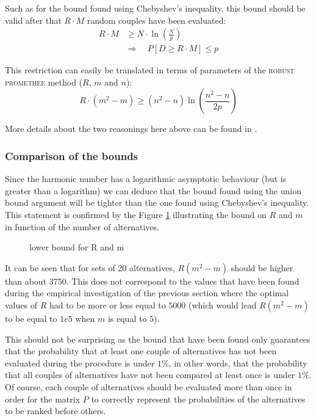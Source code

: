 Such as for the bound found using Chebyshev's inequality, this bound should be valid after that $R\cdot M$ random couples have been evaluated:
\begin{equation}
    \begin{split}
        R\cdot M & \ge N \cdot \ln (\frac{N}{p}) \\    
        & \Rightarrow \quad P[D \ge R\cdot M] \le p
    \end{split}
    \label{eqn:mr_values_unionprob}
\end{equation}

This restriction can easily be translated in terms of parameters of the \textsc{robust promethee} method ($R$, $m$ and $n$):
\begin{equation}
    R\cdot (m^2-m) \ge (n^2-n) \ln (\frac{n^2-n}{2p})
    \label{}
\end{equation}

More details about the two reasonings here above can be found in \cite{Mitzenmacher:2005:PCR:1076315}.

\subsubsection{Comparison of the bounds}

Since the harmonic number has a logarithmic asymptotic behaviour (but is greater than a logarithm) we can deduce that the bound found using the union bound argument will be tighter than the one found using Chebyshev's inequality.
This statement is confirmed by the Figure \ref{fig:bounds_on_Rm} illustrating the bound on $R$ and $m$ in function of the number of alternatives.

\begin{figure}[!t]
    \centering
    \newlength\figureheight
    \newlength\figurewidth
    \setlength\figureheight{6cm}
    \setlength\figurewidth{6cm}
    
    \caption{lower bound for R and m}
    \label{fig:bounds_on_Rm}
\end{figure}

It can be seen that for sets of 20 alternatives, $R(m^2-m)$ should be higher than about 3750.
This does not correspond to the values that have been found during the empirical investigation of the previous section where the optimal values of $R$ had to be more or less equal to $5000$ (which would lead $R(m^2-m)$ to be equal to $1e5$ when $m$ is equal to $5$).

This should not be surprising as the bound that have been found only guarantees that the probability that at least one couple of alternatives has not been evaluated during the procedure is under $1\%$, in other words, that the probability that all couples of alternatives have not been compared at least once is under $1\%$.
Of course, each couple of alternatives should be evaluated more than once in order for the matrix $P$ to correctly represent the probabilities of the alternatives to be ranked before others.

